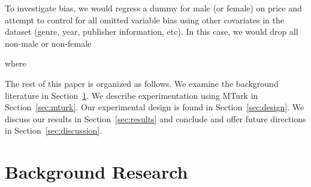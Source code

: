 \documentclass[12pt]{article}
\begin{document}
To investigate bias, we would regress a dummy for male (or female) on price and attempt to control for all omitted variable bias using other covariates in the dataset (genre, year, publisher information, etc). In this case, we would drop all non-male or non-female 

where 


%
%
%
%
%
%

The rest of this paper is organized as follows. We examine the background literature in Section~\ref{sec:background}. We describe experimentation using MTurk in Section~\ref{sec:mturk}. Our experimental design is found in Section~\ref{sec:design}. We discuss our results in Section~\ref{sec:results} and conclude and offer future directions in Section~\ref{sec:discussion}.

\section{Background Research}\label{sec:background}
\end{document}
